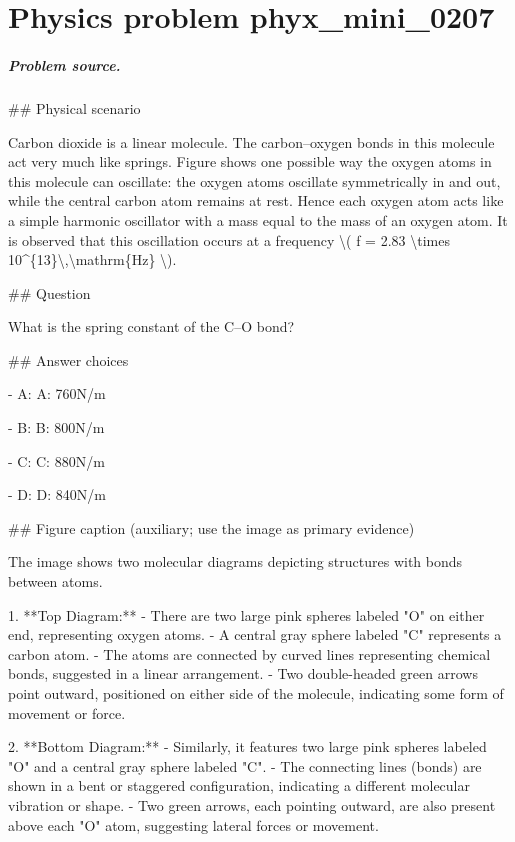 
\chapter{Physics problem phyx\_mini\_0207}
\label{ch:PhyXMiniProblems_problem_phyx_mini_0207}

\paragraph{Problem source.}
\#\# Physical scenario

Carbon dioxide is a linear molecule. The carbon--oxygen bonds in this molecule act very much like springs. Figure shows one possible way the oxygen atoms in this molecule can oscillate: the oxygen atoms oscillate symmetrically in and out, while the central carbon atom remains at rest. Hence each oxygen atom acts like a simple harmonic oscillator with a mass equal to the mass of an oxygen atom. It is observed that this oscillation occurs at a frequency \textbackslash{}( f = 2.83 \textbackslash{}times 10\textasciicircum{}\{13\}\textbackslash{},\textbackslash{}mathrm\{Hz\} \textbackslash{}).

\#\# Question

What is the spring constant of the C--O bond?

\#\# Answer choices

- A: A: 760N/m

- B: B: 800N/m

- C: C: 880N/m

- D: D: 840N/m

\#\# Figure caption (auxiliary; use the image as primary evidence)

The image shows two molecular diagrams depicting structures with bonds between atoms.

1. **Top Diagram:**
   - There are two large pink spheres labeled "O" on either end, representing oxygen atoms.
   - A central gray sphere labeled "C" represents a carbon atom.
   - The atoms are connected by curved lines representing chemical bonds, suggested in a linear arrangement.
   - Two double-headed green arrows point outward, positioned on either side of the molecule, indicating some form of movement or force.

2. **Bottom Diagram:**
   - Similarly, it features two large pink spheres labeled "O" and a central gray sphere labeled "C".
   - The connecting lines (bonds) are shown in a bent or staggered configuration, indicating a different molecular vibration or shape.
   - Two green arrows, each pointing outward, are also present above each "O" atom, suggesting lateral forces or movement.

